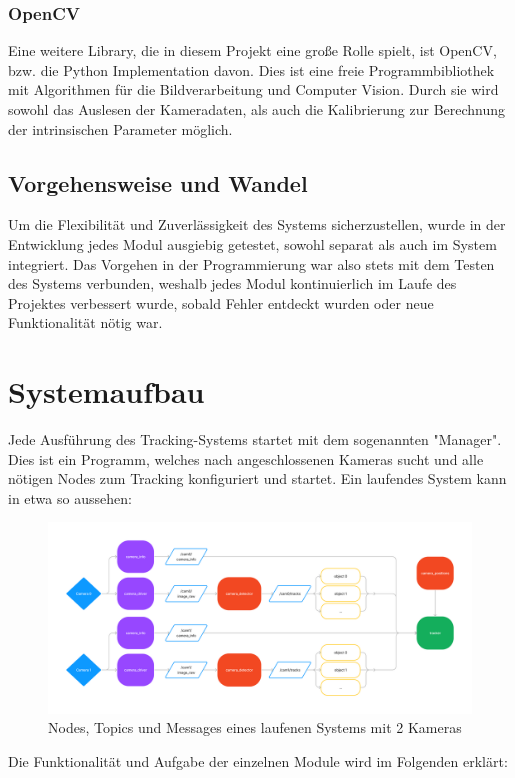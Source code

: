 \documentclass[12pt, ngerman]{article}
\begin{document}
\subsubsection{OpenCV}
Eine weitere Library, die in diesem Projekt eine große Rolle spielt, ist OpenCV, bzw. die Python Implementation davon. Dies ist eine freie Programmbibliothek mit Algorithmen für die Bildverarbeitung und Computer Vision. Durch sie wird sowohl das Auslesen der Kameradaten, als auch die Kalibrierung zur Berechnung der intrinsischen Parameter möglich.
\subsection{Vorgehensweise und Wandel}
Um die Flexibilität und Zuverlässigkeit des Systems sicherzustellen, wurde in der Entwicklung jedes Modul ausgiebig getestet, sowohl separat als auch im System integriert. Das Vorgehen in der Programmierung war also stets mit dem Testen des Systems verbunden, weshalb jedes Modul kontinuierlich im Laufe des Projektes verbessert wurde, sobald Fehler entdeckt wurden oder neue Funktionalität nötig war. 

\newpage
\section{Systemaufbau}
Jede Ausführung des Tracking-Systems startet mit dem sogenannten "Manager". Dies ist ein Programm, welches nach angeschlossenen Kameras sucht und alle nötigen Nodes zum Tracking konfiguriert und startet. Ein laufendes System kann in etwa so aussehen:
\begin{figure}[h]
  \centering
  \includegraphics[angle=0,width=\linewidth]{anytrack-basic-tracking.png}
  \caption{Nodes, Topics und Messages eines laufenen Systems mit 2 Kameras}
\end{figure}

Die Funktionalität und Aufgabe der einzelnen Module  wird im Folgenden erklärt:
\end{document}
